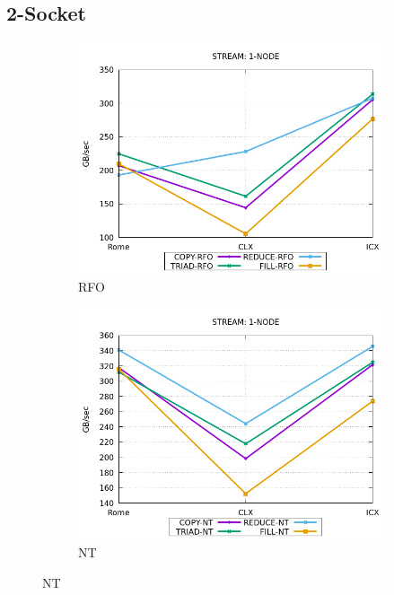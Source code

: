\documentclass{article}
\begin{document}
\subsection{2-Socket}
\begin{figure}[!ht]
    \centering
    \begin{subfigure}[!hb]{0.3\textwidth}
         \centering
         \includegraphics[width=\textwidth]{../mem_bw_node/mb_node_rfo}
         \caption{RFO}
         \label{figure:mem_bw_node_rfo}
    \end{subfigure}
    \begin{subfigure}[!hb]{0.3\textwidth}
         \centering
         \includegraphics[width=\textwidth]{../mem_bw_node/mb_node_nt}
         \caption{NT}

\end{subfigure}
\end{figure}
\end{document}
